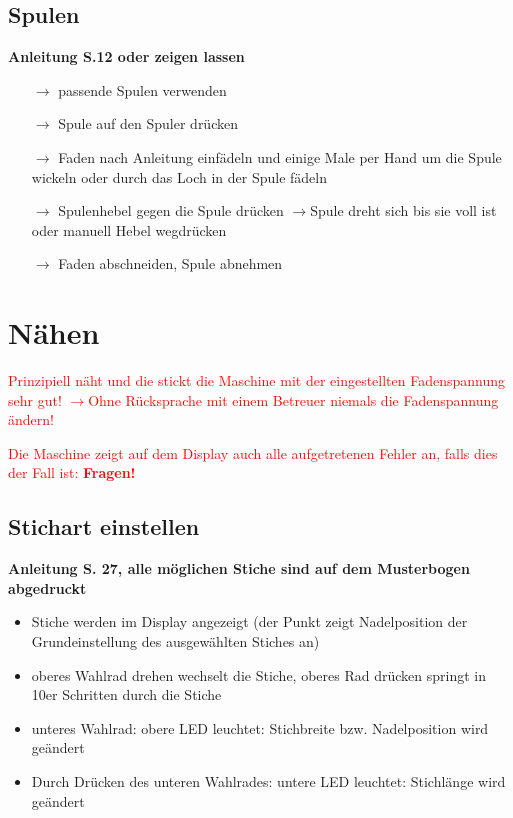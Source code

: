 \documentclass{\basedir/fablab-document}
\newcommand{\pfeil}{\ensuremath{\rightarrow}}
\begin{document}
\subsection{Spulen}
\textbf{Anleitung S.12 oder zeigen lassen}
\begin{itemize}
 \item[\pfeil] passende Spulen verwenden
 \item[\pfeil] Spule auf den Spuler drücken
 \item[\pfeil] Faden nach Anleitung einfädeln und einige Male per Hand um die Spule wickeln oder durch das Loch in der Spule fädeln
 \item[\pfeil] Spulenhebel gegen die Spule drücken \pfeil Spule dreht sich bis sie voll ist oder manuell Hebel wegdrücken
 \item[\pfeil] Faden abschneiden, Spule abnehmen
\end{itemize}

\pagebreak
\section{Nähen}

\textcolor{red}{Prinzipiell näht und die stickt die Maschine mit der eingestellten Fadenspannung sehr gut! }
\textcolor{red}{\newline \pfeil Ohne Rücksprache mit einem Betreuer niemals die Fadenspannung ändern!}

\vspace{1em}

\textcolor{red}{Die Maschine zeigt auf dem Display auch alle aufgetretenen Fehler an, falls dies der Fall ist: \textbf{Fragen!}}


\subsection{Stichart einstellen}
\textbf{Anleitung S. 27, alle möglichen Stiche sind auf dem Musterbogen abgedruckt}
\begin{itemize}
 \item Stiche werden im Display angezeigt (der Punkt zeigt Nadelposition der Grundeinstellung des ausgewählten Stiches an)
 \item oberes Wahlrad drehen wechselt die Stiche, oberes Rad drücken springt in 10er Schritten durch die Stiche
 \item unteres Wahlrad: obere LED leuchtet: Stichbreite bzw. Nadelposition wird geändert
 \item Durch Drücken des unteren Wahlrades: untere LED leuchtet: Stichlänge wird geändert
\end{itemize}
\end{document}
